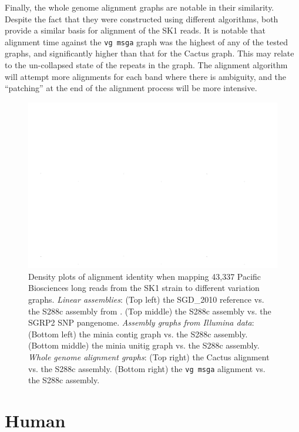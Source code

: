 Finally, the whole genome alignment graphs are notable in their similarity.
Despite the fact that they were constructed using different algorithms, both provide a similar basis for alignment of the SK1 reads.
It is notable that alignment time against the {\tt vg msga} graph was the highest of any of the tested graphs, and significantly higher than that for the Cactus graph.
This may relate to the un-collapsed state of the repeats in the graph.
The alignment algorithm will attempt more alignments for each band where there is ambiguity, and the ``patching'' at the end of the alignment process will be more intensive.

\begin{figure}[htbp!]
  \includegraphics[width=1.0\textwidth]{Chapter3/Figs/montage_vs_S288c_3x2.png}
  \caption[Long read alignment against various \emph{S. cerevisiae} pangenome graphs]{Density plots of alignment identity when mapping 43,337 Pacific Biosciences long reads from the SK1 strain to different variation graphs.
    \emph{Linear assemblies}:
    (Top left) the SGD\_2010 reference vs. the S288c assembly from \cite{yue2017contrasting}.
    (Top middle) the S288c assembly vs. the SGRP2 SNP pangenome.
    \emph{Assembly graphs from Illumina data}:
    (Bottom left) the minia contig graph vs. the S288c assembly.
    (Bottom middle) the minia unitig graph vs. the S288c assembly.
    \emph{Whole genome alignment graphs}:
    (Top right) the Cactus alignment vs. the S288c assembly.
    (Bottom right) the {\tt vg msga} alignment vs. the S288c assembly.
  }
  \label{fig:pacbio_yeast}
\end{figure}


\section{Human}

